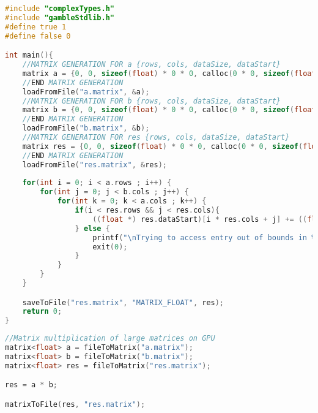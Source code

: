 \begin{lstlisting}[language=C,caption={C-code for sequential matrix multiplication using the CPU},frame=tlrb]
#include "complexTypes.h"
#include "gambleStdlib.h"
#define true 1
#define false 0

int main(){
    //MATRIX GENERATION FOR a {rows, cols, dataSize, dataStart}
    matrix a = {0, 0, sizeof(float) * 0 * 0, calloc(0 * 0, sizeof(float))};
    //END MATRIX GENERATION
    loadFromFile("a.matrix", &a);
    //MATRIX GENERATION FOR b {rows, cols, dataSize, dataStart}
    matrix b = {0, 0, sizeof(float) * 0 * 0, calloc(0 * 0, sizeof(float))};
    //END MATRIX GENERATION
    loadFromFile("b.matrix", &b);
    //MATRIX GENERATION FOR res {rows, cols, dataSize, dataStart}
    matrix res = {0, 0, sizeof(float) * 0 * 0, calloc(0 * 0, sizeof(float))};
    //END MATRIX GENERATION
    loadFromFile("res.matrix", &res);
    
    for(int i = 0; i < a.rows ; i++) {
        for(int j = 0; j < b.cols ; j++) {
            for(int k = 0; k < a.cols ; k++) {
                if(i < res.rows && j < res.cols){
                    ((float *) res.dataStart)[i * res.cols + j] += ((float *) a.dataStart)[i * a.cols + k] * ((float *) b.dataStart)[k * b.cols + j];
                } else {
                    printf("\nTrying to access entry out of bounds in %s\n", "res");
                    exit(0);
                }             
            }
        }
    }

    saveToFile("res.matrix", "MATRIX_FLOAT", res);
    return 0;
}
\end{lstlisting}

\begin{lstlisting}[language=C,caption={\gls{gamble} sourcecode for matrix multiplication using the GPU},frame=tlrb]
//Matrix multiplication of large matrices on GPU
matrix<float> a = fileToMatrix("a.matrix");
matrix<float> b = fileToMatrix("b.matrix");
matrix<float> res = fileToMatrix("res.matrix");

res = a * b;

matrixToFile(res, "res.matrix");
\end{lstlisting}

